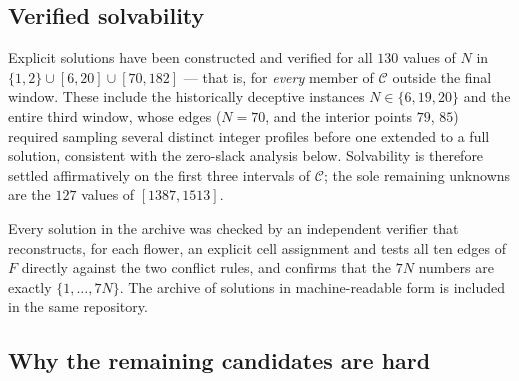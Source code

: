 \documentclass[11pt]{article}
\theoremstyle{definition}
\theoremstyle{remark}
\begin{document}
\subsection{Verified solvability}

Explicit solutions have been constructed and verified for all $130$ values of $N$ in $\{1,2\}\cup[6,20]\cup[70,182]$ --- that is, for \emph{every} member of $\mathcal{C}$ outside the final window. These include the historically deceptive instances $N\in\{6,19,20\}$ and the entire third window, whose edges ($N=70$, and the interior points $79$, $85$) required sampling several distinct integer profiles before one extended to a full solution, consistent with the zero-slack analysis below. Solvability is therefore settled affirmatively on the first three intervals of $\mathcal{C}$; the sole remaining unknowns are the $127$ values of $[1387,1513]$.

Every solution in the archive was checked by an independent verifier that reconstructs, for each flower, an explicit cell assignment and tests all ten edges of $F$ directly against the two conflict rules, and confirms that the $7N$ numbers are exactly $\{1,\dots,7N\}$. The archive of solutions in machine-readable form is included in the same repository.

\subsection{Why the remaining candidates are hard}
\end{document}
